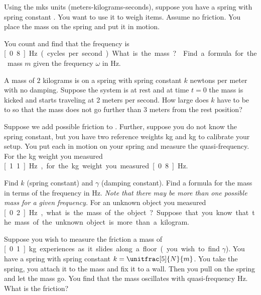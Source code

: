\begin{exercise} \label{mv:exwt1}
Using the mks units (meters-kilograms-seconds),
suppose you have a spring with spring constant .
You want to use
it to weigh items.  Assume no friction.  You place the mass on
the spring and put it in motion.
\begin{tasks}
\task You count and find that the frequency is
\unit[0.8]{Hz} (cycles per second).  What is the mass?
\task Find a formula for the mass $m$
given the frequency $\omega$ in \unit{Hz}.
\end{tasks}
\end{exercise}

\begin{exercise}\ansMark%
A mass of $2$ kilograms is on a spring with spring constant $k$ newtons per
meter with no damping.  Suppose the system is at rest and at time $t=0$ the
mass is kicked and starts traveling at 2 meters per second.  How large
does $k$ have to be to so that the mass does not go further than 3 meters
from the rest position?
\end{exercise}

\begin{exercise}
Suppose we add possible friction to .
Further, suppose you do not know the spring constant, but you have
two reference weights \unit[1]{kg} and \unit[2]{kg} to calibrate your setup.
You put each in motion on your spring and measure the
quasi-frequency.  For the \unit[1]{kg}
weight you measured \unit[1.1]{Hz}, for the \unit[2]{kg} weight you
measured \unit[0.8]{Hz}.
\begin{tasks}
\task Find $k$ (spring constant) and $\gamma$ (damping constant).
\task Find a formula for the mass in terms of the frequency in Hz.  \emph{Note that
there may be more than one possible mass for a given frequency.}
\task For an unknown object you measured \unit[0.2]{Hz}, what is the mass of the
object?  Suppose that you know that the mass of the unknown object
is more than a kilogram.
\end{tasks}
\end{exercise}

\begin{exercise}
Suppose you wish to measure the friction a mass of \unit[0.1]{kg} experiences
as it slides along a floor (you wish to find $\gamma$).  You have a spring with
spring constant $k=\unitfrac[5]{N}{m}$.  You take the spring, you attach it
to the mass and fix it to a wall.  Then you pull on the spring and let the
mass go.  You find that the mass oscillates with quasi-frequency \unit[1]{Hz}.
What is the friction?
\end{exercise}

